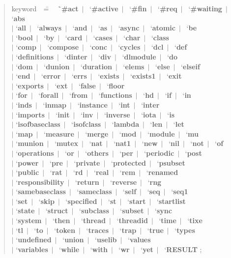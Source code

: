 \documentclass{overturerepchap}
\newcommand{\Rule}[2]{
  \begin{quote}\begin{tabbing}
    #1\index{#1}\ \ \= = \ \ \= #2  ; %
    
  \end{tabbing}\end{quote}
  }
\newcommand{\RuleTarget}[1]{\hypertarget{rule:#1}{}}
\newcommand{\Ruledef}[2]
{
  \RuleTarget{#1}\Rule{#1}{#2}%
  }
\newcommand{\dsepl}{\ $|$\ }
\newcommand{\dsep}{\\ \> $|$ \>}
\newcommand{\Lop}[1]{`{\bf\ttfamily #1}\Quote}
\begin{document}
\newcommand{\Lks}[1]{\Lop{#1}\dsepl}
\newcommand{\Lksb}[1]{\Lop{#1}\dsep}
\Ruledef{keyword}{
  \Lks{\#act}
  \Lks{\#active}
  \Lks{\#fin}
  \Lks{\#req}
  \Lks{\#waiting}
  \Lksb{abs}
  \Lks{all}
  \Lks{always}
  \Lks{and}
\Lks{as}
  \Lks{async}
  \Lks{atomic}
  \Lksb{be}
  \Lks{bool}
  \Lks{by}
  \Lks{card}
  \Lks{cases}
  \Lks{char}
  \Lksb{class}
  \Lks{comp}
  \Lks{compose} 
  \Lks{conc}
  \Lks{cycles}
  \Lks{dcl}
  \Lksb{def}
  \Lks{definitions}
  \Lks{dinter} 
  \Lks{div}
  \Lks{dlmodule}
  \Lksb{do}
  \Lks{dom}
  \Lks{dunion}
  \Lks{duration}
  \Lks{elems}
  \Lks{else}
  \Lksb{elseif}
  \Lks{end}
  \Lks{error}
  \Lks{errs}
  \Lks{exists}
  \Lks{exists1}
  \Lksb{exit} 
  \Lks{exports}
  \Lks{ext} 
  \Lks{false} 
  \Lksb{floor}
  \Lks{for} 
  \Lks{forall}
  \Lks{from}
  \Lks{functions}
  \Lks{hd} 
  \Lks{if}
  \Lksb{in} 
  \Lks{inds}
  \Lks{inmap}
  \Lks{instance}
  \Lks{int}
  \Lksb{inter}
  \Lks{imports}
  \Lks{init}
  \Lks{inv}
  \Lks{inverse}
  \Lks{iota}
  \Lksb{is}
  \Lks{isofbaseclass}
  \Lks{isofclass}
  \Lks{lambda}
  \Lks{len} 
  \Lksb{let}
  \Lks{map}
  \Lks{measure}
  \Lks{merge} 
  \Lks{mod} 
  \Lks{module}
  \Lksb{mu}
  \Lks{munion}
  \Lks{mutex}
  \Lks{nat}
  \Lks{nat1}
  \Lks{new}
  \Lks{nil} 
  \Lks{not}
  \Lksb{of}
  \Lks{operations}
  \Lks{or}
  \Lks{others}
  \Lks{per}
  \Lks{periodic}
  \Lksb{post}
  \Lks{power} 
  \Lks{pre}
  \Lks{private}
  \Lks{protected}
  \Lksb{psubset}
  \Lks{public}
  \Lks{rat}
  \Lks{rd}
  \Lks{real} 
  \Lks{rem}
  \Lksb{renamed}
  \Lks{responsibility}
  \Lks{return}
  \Lks{reverse}
  \Lksb{rng}
  \Lks{samebaseclass}
  \Lks{sameclass}
  \Lks{self}
  \Lks{seq}
  \Lksb{seq1}
  \Lks{set}
  \Lks{skip}
  \Lks{specified}
  \Lks{st}
  \Lks{start}
  \Lksb{startlist}
  \Lks{state}
  \Lks{struct}
  \Lks{subclass}
  \Lks{subset}
  \Lksb{sync}
  \Lks{system}
  \Lks{then}
  \Lks{thread}
  \Lks{threadid}
  \Lks{time}
  \Lksb{tixe}
  \Lks{tl}
  \Lks{to}
  \Lks{token}
  \Lks{traces}
  \Lks{trap} 
  \Lks{true}
  \Lksb{types}
  \Lks{undefined}
  \Lks{union}
  \Lks{uselib}
  \Lksb{values} 
  \Lks{variables}
  \Lks{while} 
  \Lks{with}
  \Lks{wr}
  \Lks{yet}
  \Lop{RESULT} 
  }

\end{document}
